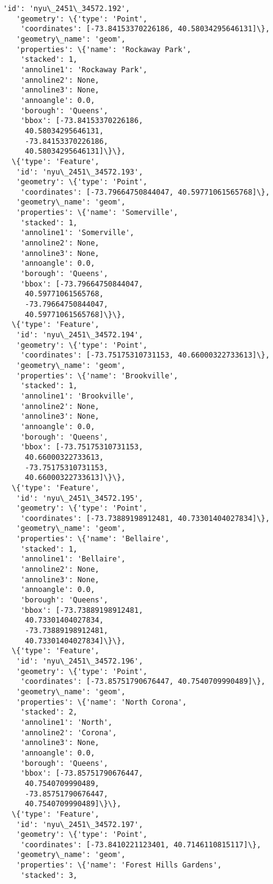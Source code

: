 \documentclass[11pt]{article}
\begin{document}
\begin{tcolorbox}[breakable, size=fbox, boxrule=.5pt, pad at break*=1mm, opacityfill=0]
\begin{Verbatim}[commandchars=\\\{\}]
   'id': 'nyu\_2451\_34572.192',
   'geometry': \{'type': 'Point',
    'coordinates': [-73.84153370226186, 40.58034295646131]\},
   'geometry\_name': 'geom',
   'properties': \{'name': 'Rockaway Park',
    'stacked': 1,
    'annoline1': 'Rockaway Park',
    'annoline2': None,
    'annoline3': None,
    'annoangle': 0.0,
    'borough': 'Queens',
    'bbox': [-73.84153370226186,
     40.58034295646131,
     -73.84153370226186,
     40.58034295646131]\}\},
  \{'type': 'Feature',
   'id': 'nyu\_2451\_34572.193',
   'geometry': \{'type': 'Point',
    'coordinates': [-73.79664750844047, 40.59771061565768]\},
   'geometry\_name': 'geom',
   'properties': \{'name': 'Somerville',
    'stacked': 1,
    'annoline1': 'Somerville',
    'annoline2': None,
    'annoline3': None,
    'annoangle': 0.0,
    'borough': 'Queens',
    'bbox': [-73.79664750844047,
     40.59771061565768,
     -73.79664750844047,
     40.59771061565768]\}\},
  \{'type': 'Feature',
   'id': 'nyu\_2451\_34572.194',
   'geometry': \{'type': 'Point',
    'coordinates': [-73.75175310731153, 40.66000322733613]\},
   'geometry\_name': 'geom',
   'properties': \{'name': 'Brookville',
    'stacked': 1,
    'annoline1': 'Brookville',
    'annoline2': None,
    'annoline3': None,
    'annoangle': 0.0,
    'borough': 'Queens',
    'bbox': [-73.75175310731153,
     40.66000322733613,
     -73.75175310731153,
     40.66000322733613]\}\},
  \{'type': 'Feature',
   'id': 'nyu\_2451\_34572.195',
   'geometry': \{'type': 'Point',
    'coordinates': [-73.73889198912481, 40.73301404027834]\},
   'geometry\_name': 'geom',
   'properties': \{'name': 'Bellaire',
    'stacked': 1,
    'annoline1': 'Bellaire',
    'annoline2': None,
    'annoline3': None,
    'annoangle': 0.0,
    'borough': 'Queens',
    'bbox': [-73.73889198912481,
     40.73301404027834,
     -73.73889198912481,
     40.73301404027834]\}\},
  \{'type': 'Feature',
   'id': 'nyu\_2451\_34572.196',
   'geometry': \{'type': 'Point',
    'coordinates': [-73.85751790676447, 40.7540709990489]\},
   'geometry\_name': 'geom',
   'properties': \{'name': 'North Corona',
    'stacked': 2,
    'annoline1': 'North',
    'annoline2': 'Corona',
    'annoline3': None,
    'annoangle': 0.0,
    'borough': 'Queens',
    'bbox': [-73.85751790676447,
     40.7540709990489,
     -73.85751790676447,
     40.7540709990489]\}\},
  \{'type': 'Feature',
   'id': 'nyu\_2451\_34572.197',
   'geometry': \{'type': 'Point',
    'coordinates': [-73.8410221123401, 40.7146110815117]\},
   'geometry\_name': 'geom',
   'properties': \{'name': 'Forest Hills Gardens',
    'stacked': 3,

\end{Verbatim}
\end{tcolorbox}
\end{document}
